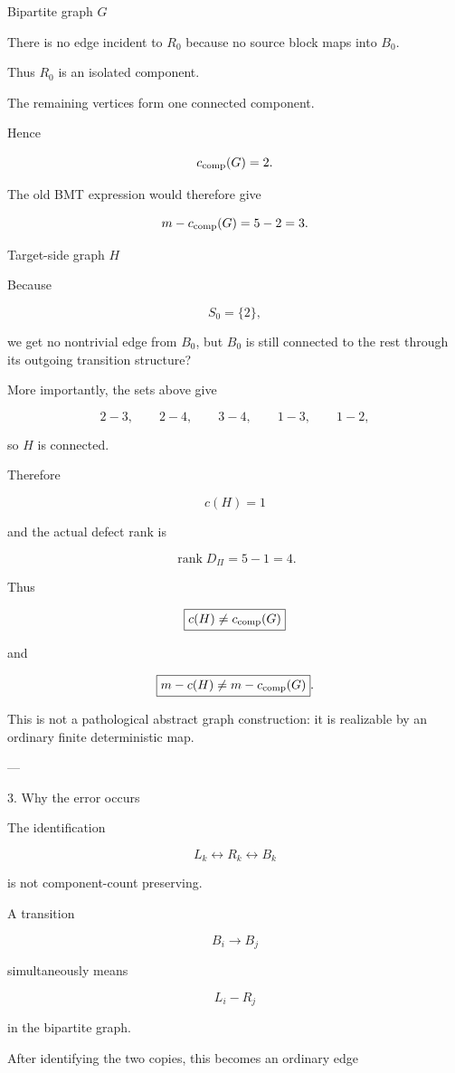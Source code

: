 Bipartite graph \(G\)

There is no edge incident to \(R_0\) because no source block maps into \(B_0\).

Thus \(R_0\) is an isolated component.

The remaining vertices form one connected component.

Hence

\[
c_{\rm comp}(G)=2.
\]

The old BMT expression would therefore give

\[
m-c_{\rm comp}(G)=5-2=3.
\]

Target-side graph \(H\)

Because

\[
S_0=\{2\},
\]

we get no nontrivial edge from \(B_0\), but \(B_0\) is still connected to the rest through its outgoing transition structure?

More importantly, the sets above give

\[
2\!-\!3,\qquad
2\!-\!4,\qquad
3\!-\!4,\qquad
1\!-\!3,\qquad
1\!-\!2,
\]

so \(H\) is connected.

Therefore

\[
c(H)=1
\]

and the actual defect rank is

\[
\boxed{\operatorname{rank}D_\Pi=5-1=4}.
\]

Thus

\[
\boxed{c(H)\neq c_{\rm comp}(G)}
\]

and

\[
\boxed{m-c(H)\neq m-c_{\rm comp}(G)}.
\]

This is not a pathological abstract graph construction: it is realizable by an ordinary finite deterministic map.


---

3. Why the error occurs

The identification

\[
L_k\leftrightarrow R_k\leftrightarrow B_k
\]

is not component-count preserving.

A transition

\[
B_i\to B_j
\]

simultaneously means

\[
L_i-R_j
\]

in the bipartite graph.

After identifying the two copies, this becomes an ordinary edge

